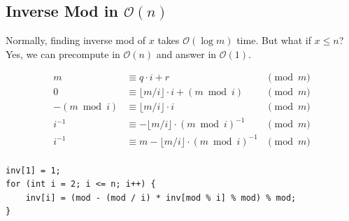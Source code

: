 \subsection{Inverse Mod in \texorpdfstring{$\mathcal{O}(n)$}{O(n)}}

Normally, finding inverse mod of $x$ takes $\mathcal{O}(\log m)$ time.
But what if $x \le n$?
Yes, we can precompute in $\mathcal{O}(n)$ and answer in $\mathcal{O}(1)$.

\begin{align*}
    m &\equiv q \cdot i + r &\pmod{m}\\
    0 &\equiv \lfloor m/i \rfloor \cdot i + (m \bmod i) &\pmod{m}\\
    -(m \bmod i) &\equiv \lfloor m/i \rfloor \cdot i &\pmod{m}\\
    i^{-1} &\equiv -\lfloor m/i \rfloor \cdot (m \bmod i)^{-1} &\pmod{m}\\
    i^{-1} &\equiv m - \lfloor m/i \rfloor \cdot (m \bmod i)^{-1} &\pmod{m}\\
\end{align*}

\begin{lstlisting}
inv[1] = 1;
for (int i = 2; i <= n; i++) {
    inv[i] = (mod - (mod / i) * inv[mod % i] % mod) % mod;
}
\end{lstlisting}

